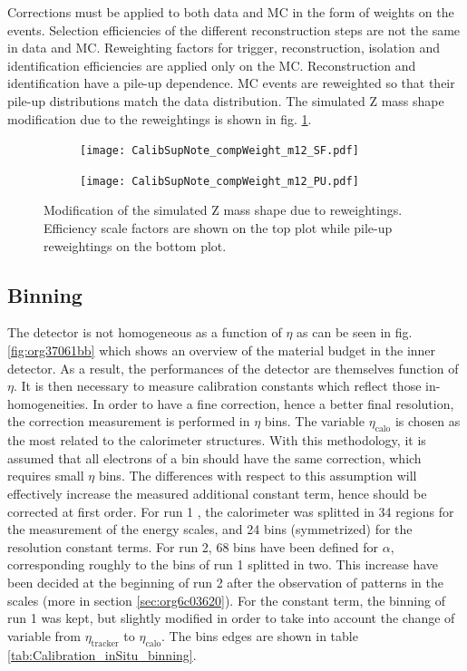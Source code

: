 Corrections must be applied to both data and MC in the form of weights on the events.
Selection efficiencies of the different reconstruction steps are not the same in data and MC.
Reweighting factors for trigger, reconstruction, isolation and identification efficiencies are applied only on the MC.
Reconstruction and identification have a pile-up dependence.
MC events are reweighted so that their pile-up distributions match the data distribution.
The simulated Z mass shape modification due to the reweightings is shown in fig. \ref{orgb5c10cf}.

\begin{figure}
\begin{subfigure}[t]{\linewidth}
\begin{center}
\texttt{[image: CalibSupNote\_compWeight\_m12\_SF.pdf]}
\end{center}
\end{subfigure}
\begin{subfigure}[t]{\linewidth}
\begin{center}
\texttt{[image: CalibSupNote\_compWeight\_m12\_PU.pdf]}
\end{center}
\end{subfigure}
\caption{\label{orgb5c10cf}
Modification of the simulated Z mass shape due to reweightings. Efficiency scale factors are shown on the top plot while pile-up reweightings on the bottom plot.}
\end{figure}

\subsection{Binning}

  The detector is not homogeneous as a function of $\eta$ as can be seen in fig. \ref{fig:org37061bb} which shows an overview of the material budget in the inner detector.
  As a result, the performances of the detector are themselves function of $\eta$.
  It is then necessary to measure calibration constants which reflect those in-homogeneities.
  In order to have a fine correction, hence a better final resolution, the correction measurement is performed in $\eta$ bins.
  The variable $\eta_{\text{calo}}$ is chosen as the most related to the calorimeter structures.
  With this methodology, it is assumed that all electrons of a bin should have the same correction, which requires small $\eta$ bins.
  The differences with respect to this assumption will effectively increase the measured additional constant term, hence should be corrected at first order.
  For run 1 \cite{CERN-PH-EP-2014-153}, the calorimeter was splitted in 34 regions for the measurement of the energy scales, and 24 bins (symmetrized) for the resolution constant terms.
  For run 2, 68 bins have been defined for \(\alpha\), corresponding roughly to the bins of run 1 splitted in two.
  This increase have been decided at the beginning of run 2 after the observation of patterns in the scales (more in section \ref{sec:org6c03620}).
  For the constant term, the binning of run 1 was kept, but slightly modified in order to take into account the change of variable from $\eta_\text{tracker}$ to $\eta_\text{calo}$.
  The bins edges are shown in table \ref{tab:Calibration_inSitu_binning}.

